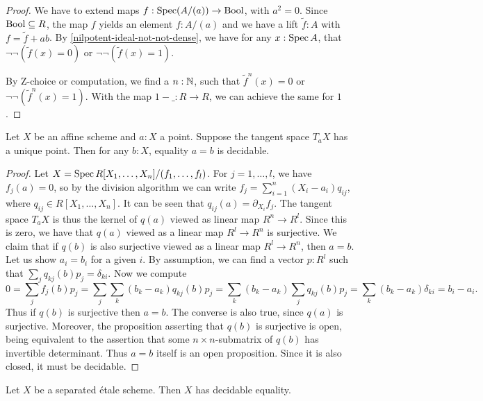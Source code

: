 \begin{proof}
  We have to extend maps $f:\operatorname{Spec} (A/(a))\to \mathrm{Bool}$, with $a^2=0$.
  Since $\mathrm{Bool}\subseteq R$, the map $f$ yields an element $f:A/(a)$
  and we have a lift $\tilde{f}:A$ with $f=\tilde{f}+ab$.
  By \cref{nilpotent-ideal-not-not-dense},
  we have for any $x:\operatorname{Spec} A$, that $\neg\neg(\tilde{f}(x)=0)$ or $\neg\neg(\tilde{f}(x)=1)$.

  By Z-choice or computation, we find a $n:\mathbb{N}$,
  such that $\tilde{f}^n(x)=0$ or $\neg\neg(\tilde{f}^n(x)=1)$.
  With the map $1-\_:R\to R$, we can achieve the same for $1$.
\end{proof}

\begin{proposition}%
	\label{decidable-of-tangent}
	Let $X$ be an affine scheme and $a : X$ a point. Suppose the tangent space
	$T_a X$ has a unique point. Then for any $b : X$, equality $a = b$ is decidable.
\end{proposition}

\begin{proof}
	Let $X = \operatorname{Spec} R[X_1,\ldots,X_n]/(f_1,\ldots,f_l)$.
	For $j = 1,\ldots,l$, we have $f_j(a) = 0$, so by the division algorithm
	we can write $f_j = \sum_{i = 1}^n (X_i-a_i)q_{ij}$, where
	$q_{ij} \in R[X_1,\ldots,X_n]$.
	It can be seen that $q_{ij}(a) = \partial_{X_i}f_j$.
	The tangent space $T_a X$ is thus the kernel of $q(a)$ viewed as 
	linear map $R^n \to R^l$.
	Since this is zero, we have that $q(a)$ viewed as a linear map
	$R^l \to R^n$ is surjective.
	We claim that if $q(b)$ is also surjective viewed as a linear map
	$R^l \to R^n$, then $a = b$.
	Let us show $a_i = b_i$ for a given $i$.
	By assumption, we can find a vector $p : R^l$ such
	that $\sum_j q_{kj}(b)p_j = \delta_{ki}$.
	Now we compute
	\[
	0 = \sum_j f_j(b)p_j 
	= \sum_j \sum_k (b_k-a_k)q_{kj}(b)p_j 
	= \sum_k (b_k-a_k) \sum_j q_{kj}(b)p_j 
	= \sum_k (b_k-a_k) \delta_{ki} 
	= b_i - a_i.
	\]
	Thus if $q(b)$ is surjective then $a = b$. The converse is also true,
	since $q(a)$ is surjective.
	Moreover, the proposition asserting that $q(b)$ is surjective
	is open, being equivalent to the assertion that some 
	$n \times n$-submatrix of $q(b)$ has invertible determinant.
	Thus $a = b$ itself is an open proposition. 
	Since it is also closed, it must be decidable.
\end{proof}

\begin{proposition}%
	Let $X$ be a separated \'{e}tale scheme. Then $X$ has decidable equality.
\end{proposition}

